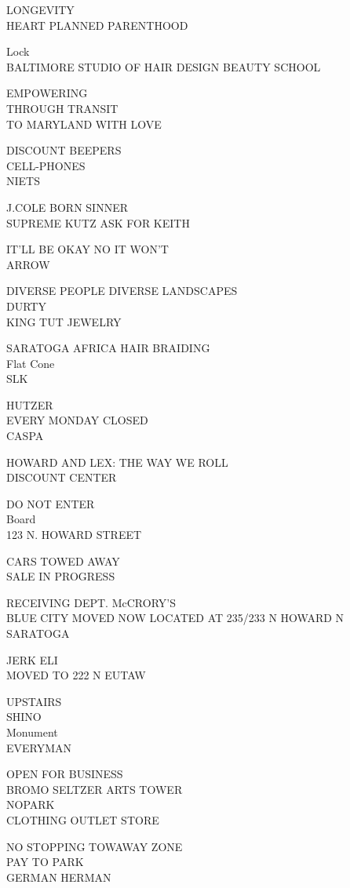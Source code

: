 \documentclass[10pt,letterpaper]{article}
\begin{document}
LONGEVITY\\
HEART PLANNED PARENTHOOD

Lock\\
BALTIMORE STUDIO OF HAIR DESIGN BEAUTY SCHOOL

EMPOWERING\\
THROUGH TRANSIT\\
TO MARYLAND WITH LOVE

DISCOUNT BEEPERS\\
CELL{-}PHONES\\
NIETS

J.COLE BORN SINNER\\
SUPREME KUTZ ASK FOR KEITH

IT'LL BE OKAY NO IT WON'T\\
ARROW

DIVERSE PEOPLE DIVERSE LANDSCAPES\\
DURTY\\
KING TUT JEWELRY

SARATOGA AFRICA HAIR BRAIDING\\
Flat Cone\\
SLK

HUTZER\\
EVERY MONDAY CLOSED\\
CASPA

HOWARD AND LEX: THE WAY WE ROLL\\
DISCOUNT CENTER

DO NOT ENTER\\
Board\\
123 N. HOWARD STREET

CARS TOWED AWAY\\
SALE IN PROGRESS

RECEIVING DEPT. McCRORY'S\\
BLUE CITY MOVED NOW LOCATED AT 235/233 N HOWARD N SARATOGA

JERK ELI\\
MOVED TO 222 N EUTAW

UPSTAIRS\\
SHINO\\
Monument\\
EVERYMAN

OPEN FOR BUSINESS\\
BROMO SELTZER ARTS TOWER\\
NOPARK\\
CLOTHING OUTLET STORE

NO STOPPING TOWAWAY ZONE\\
PAY TO PARK\\
GERMAN HERMAN
\end{document}
